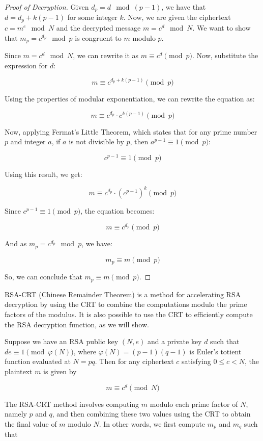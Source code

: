 \documentclass{article}
\theoremstyle{definition}
\begin{document}
\begin{proof}[Proof of Decryption]
	Given $d_p = d \mod (p-1)$, we have that $d = d_p + k(p - 1)$ for some integer $k$. Now, we are given the ciphertext $c = m^e \mod N$ and the decrypted message $m = c^d \mod N$. We want to show that $m_p = c^{d_p} \mod p$ is congruent to $m$ modulo $p$.
	
	Since $m = c^d \mod N$, we can rewrite it as $m \equiv c^d \pmod{p}$. Now, substitute the expression for $d$:
	
	$$m \equiv c^{d_p + k(p - 1)} \pmod{p}$$
	
	Using the properties of modular exponentiation, we can rewrite the equation as:
	
	$$m \equiv c^{d_p} \cdot c^{k(p - 1)} \pmod{p}$$
	
	Now, applying Fermat's Little Theorem, which states that for any prime number $p$ and integer $a$, if $a$ is not divisible by $p$, then $a^{p-1} \equiv 1 \pmod{p}$:
	
	$$c^{p-1} \equiv 1 \pmod{p}$$
	
	Using this result, we get:
	
	$$m \equiv c^{d_p} \cdot (c^{p - 1})^k \pmod{p}$$
	
	Since $c^{p-1} \equiv 1 \pmod{p}$, the equation becomes:
	
	$$m \equiv c^{d_p} \pmod{p}$$
	
	And as $m_p = c^{d_p} \mod p$, we have:
	
	$$m_p \equiv m \pmod{p}$$
	
	So, we can conclude that $m_p \equiv m \pmod{p}$.

\end{proof}


\newpage

RSA-CRT (Chinese Remainder Theorem) is a method for accelerating RSA decryption by using the CRT to combine the computations modulo the prime factors of the modulus. It is also possible to use the CRT to efficiently compute the RSA decryption function, as we will show.

Suppose we have an RSA public key $(N,e)$ and a private key $d$ such that $de \equiv 1 \pmod{\varphi(N)}$, where $\varphi(N) = (p-1)(q-1)$ is Euler's totient function evaluated at $N=pq$. Then for any ciphertext $c$ satisfying $0\leq c < N$, the plaintext $m$ is given by

$$ m \equiv c^d \pmod{N} $$

The RSA-CRT method involves computing $m$ modulo each prime factor of $N$, namely $p$ and $q$, and then combining these two values using the CRT to obtain the final value of $m$ modulo $N$. In other words, we first compute $m_p$ and $m_q$ such that
\end{document}
